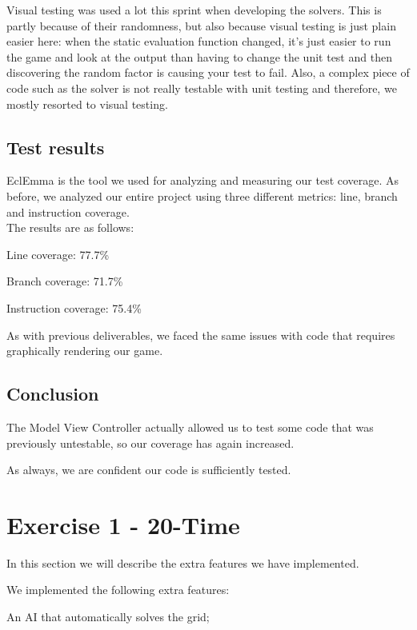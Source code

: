 \documentclass[a4paper,11pt,report]{scrartcl}
\begin{document}
Visual testing was used a lot this sprint when developing the solvers. This is
partly because of their randomness, but also because visual testing is just
plain easier here: when the static evaluation function changed, it's just easier
to run the game and look at the output than having to change the unit test and
then discovering the random factor is causing your test to fail. Also, a complex
piece of code such as the solver is not really testable with unit testing and
therefore, we mostly resorted to visual testing.

\subsection{Test results}
EclEmma is the tool we used for analyzing and measuring our test coverage.
As before, we analyzed our entire project using three different metrics: line,
branch and instruction coverage.\\

The results are as follows:
\begin{description}
	\item Line coverage: 77.7\%
	\item Branch coverage: 71.7\%
	\item Instruction coverage: 75.4\%
\end{description}
As with previous deliverables, we faced the same issues with code that requires
graphically rendering our game. 

\subsection{Conclusion}
The Model View Controller actually allowed us to test some code that was
previously untestable, so our coverage has again increased.

As always, we are confident our code is sufficiently tested.

\newpage\section{Exercise 1 - 20-Time}
In this section we will describe the extra features we have implemented.

We implemented the following extra features:
\begin{description}
	\item An AI that automatically solves the grid;
\end{description}
\end{document}
